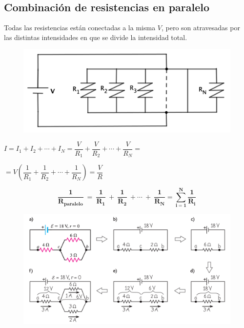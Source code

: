 \subsection{Combinación de resistencias en paralelo}

Todas las resistencias están conectadas a la misma $V$, pero son atravesadas por las distintas intensidades en que se divide la intensidad total.

\begin{figure}[H]
	\centering
	\includegraphics[width=.9\textwidth]{imagenes/imagenes25/T25IM03.png}
\end{figure}


$I=I_1+I_2+\cdots + I_N=\dfrac V{R_1}+\dfrac V{R_2}+\cdots +\dfrac V{R_N}= $

$=V \left( \dfrac 1{R_1}+ \dfrac 1{R_2}+ \cdots +\dfrac 1{R_N} \right)  =\dfrac V R$

\begin{equation}
\boldsymbol{ \dfrac 1 {R_{paralelo}} \ = \ \dfrac 1{R_1} \ + \ \dfrac 1{R_2} \ + \cdots \ + \ \dfrac 1{R_N} = \sum_{i=1}^N \dfrac 1{R_i} }
\end{equation}


\vspace{10mm} %

\begin{figure}[H]
	\centering
	\includegraphics[width=1.05\textwidth]{imagenes/imagenes25/T25IM04.png}
\end{figure}

